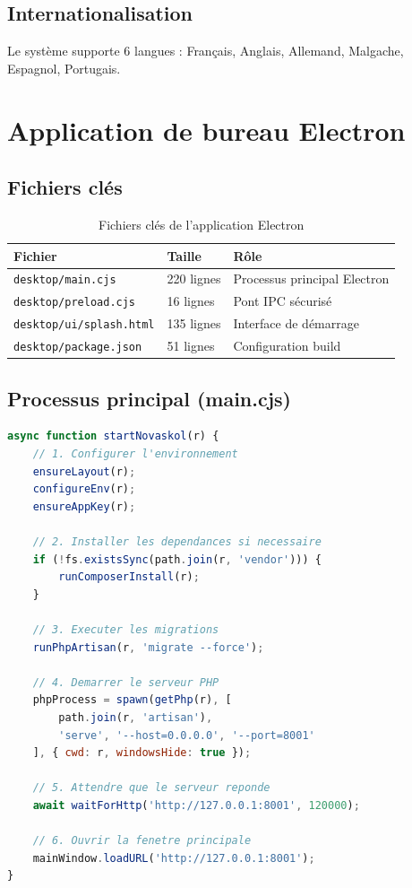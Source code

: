 \documentclass[12pt,a4paper,twoside]{report}
\begin{document}
\subsection{Internationalisation}

Le système supporte 6 langues : Français, Anglais, Allemand, Malgache, Espagnol, Portugais.

\section{Application de bureau Electron}

\subsection{Fichiers clés}

\begin{table}[h]
\centering
\caption{Fichiers clés de l'application Electron}
\begin{tabular}{lll}
\toprule
Fichier & Taille & Rôle \\
\midrule
\texttt{desktop/main.cjs} & 220 lignes & Processus principal Electron \\
\texttt{desktop/preload.cjs} & 16 lignes & Pont IPC sécurisé \\
\texttt{desktop/ui/splash.html} & 135 lignes & Interface de démarrage \\
\texttt{desktop/package.json} & 51 lignes & Configuration build \\
\bottomrule
\end{tabular}
\end{table}

\subsection{Processus principal (main.cjs)}

\begin{lstlisting}[language=JavaScript]
async function startNovaskol(r) {
    // 1. Configurer l'environnement
    ensureLayout(r);
    configureEnv(r);
    ensureAppKey(r);

    // 2. Installer les dependances si necessaire
    if (!fs.existsSync(path.join(r, 'vendor'))) {
        runComposerInstall(r);
    }

    // 3. Executer les migrations
    runPhpArtisan(r, 'migrate --force');

    // 4. Demarrer le serveur PHP
    phpProcess = spawn(getPhp(r), [
        path.join(r, 'artisan'),
        'serve', '--host=0.0.0.0', '--port=8001'
    ], { cwd: r, windowsHide: true });

    // 5. Attendre que le serveur reponde
    await waitForHttp('http://127.0.0.1:8001', 120000);

    // 6. Ouvrir la fenetre principale
    mainWindow.loadURL('http://127.0.0.1:8001');
}
\end{lstlisting}
\end{document}

